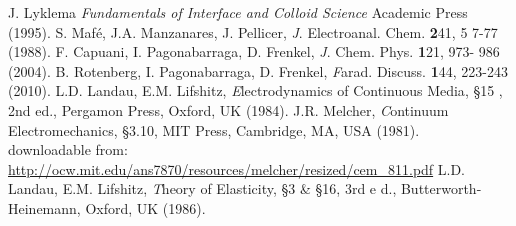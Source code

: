 \begin{thebibliography}{99}
 J. Lyklema {\em Fundamentals of Interface and Colloid Science} Academic Press     (1995).
 S. Maf\'e, J.A. Manzanares, J. Pellicer, {\textit J. Electroanal. Chem.} {\textbf 241}, 5    7-77 (1988).
 F. Capuani, I. Pagonabarraga, D. Frenkel, {\textit J. Chem. Phys.} {\textbf 121}, 973-    986 (2004).
 B. Rotenberg, I. Pagonabarraga, D. Frenkel, {\textit Farad. Discuss.} {\textbf 144},     223-243 (2010).
 L.D. Landau, E.M. Lifshitz, {\textit Electrodynamics of Continuous Media}, \S 15    , 2nd ed., Pergamon Press, Oxford, UK (1984).
 J.R. Melcher, {\textit Continuum Electromechanics}, \S 3.10, MIT Press, Cambridge,     MA, USA (1981).\\
downloadable from:\\
\url{http://ocw.mit.edu/ans7870/resources/melcher/resized/cem_811.pdf}
 L.D. Landau, E.M. Lifshitz, {\textit Theory of Elasticity}, \S 3 \& \S 16, 3rd e    d., Butterworth-Heinemann, Oxford, UK (1986).



\end{thebibliography}


